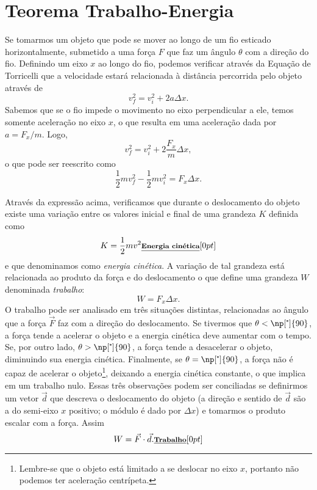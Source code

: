 \section{Teorema Trabalho-Energia}


Se tomarmos um objeto que pode se mover ao longo de um fio esticado horizontalmente, submetido a uma força $F$ que faz um ângulo $\theta$ com a direção do fio. Definindo um eixo $x$ ao longo do fio, podemos verificar através da Equação de Torricelli que a velocidade estará relacionada à distância percorrida pelo objeto através de
\begin{equation}
  v_f^2 = v_i^2 + 2 a \Delta x.
\end{equation}
%
Sabemos que se o fio impede o movimento no eixo perpendicular a ele, temos somente aceleração no eixo $x$, o que resulta em uma aceleração dada por $a = F_x/m$. Logo,
\begin{equation}
  v_f^2 = v_i^2 + 2 \frac{F_x}{m} \Delta x,
\end{equation}
%
o que pode ser reescrito como
\begin{equation}
  \frac{1}{2} m v_f^2 - \frac{1}{2} m v_i^2 = F_x \Delta x.
\end{equation}

Através da expressão acima, verificamos que durante o deslocamento do objeto existe uma variação entre os valores inicial e final de uma grandeza $K$ definida como
\begin{equation}
  K = \frac{1}{2} m v^2 \relax{\footnotesize\emph{\textbf{Energia cinética}}}[0pt]
\end{equation}
%
e que denominamos como \emph{energia cinética}. A variação de tal grandeza está relacionada ao produto da força e do deslocamento o que define uma grandeza $W$ denominada \emph{trabalho}:
\begin{equation}
  W = F_x \Delta x.
\end{equation}
%
O trabalho pode ser analisado em três situações distintas, relacionadas ao ângulo que a força $\vec{F}$ faz com a direção do deslocamento. Se tivermos que $\theta < \np[\tcdegree]{90}$, a força tende a acelerar o objeto e a energia cinética deve aumentar com o tempo. Se, por outro lado, $\theta > \np[\tcdegree]{90}$, a força tende a desacelerar o objeto, diminuindo sua energia cinética. Finalmente, se $\theta = \np[\tcdegree]{90}$, a força não é capaz de acelerar o objeto\footnote{Lembre-se que o objeto está limitado a se deslocar no eixo $x$, portanto não podemos ter aceleração centrípeta.}, deixando a energia cinética constante, o que implica em um trabalho nulo. Essas três observações podem ser conciliadas se definirmos um vetor $\vec{d}$ que descreva o deslocamento do objeto (a direção e sentido de $\vec{d}$ são a do semi-eixo $x$ positivo; o módulo é dado por $\Delta x$) e tomarmos o produto escalar com a força. Assim
\begin{equation}
  W = \vec{F}\cdot\vec{d}. \relax{\footnotesize\emph{\textbf{Trabalho}}}[0pt]
\end{equation}

